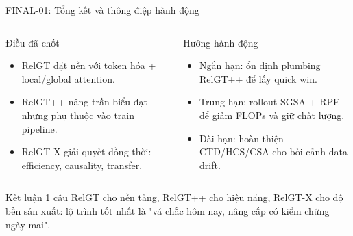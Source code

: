 \documentclass[aspectratio=169,11pt]{beamer}
\begin{document}
\begin{frame}{FINAL-01: Tổng kết và thông điệp hành động}
  \small
  \begin{columns}[T]
    \begin{block}{Điều đã chốt}
      \begin{itemize}
        \item RelGT đặt nền với token hóa + local/global attention.
        \item RelGT++ nâng trần biểu đạt nhưng phụ thuộc vào train pipeline.
        \item RelGT-X giải quyết đồng thời: efficiency, causality, transfer.
      \end{itemize}
    \end{block}
    \begin{exampleblock}{Hướng hành động}
      \begin{itemize}
        \item Ngắn hạn: ổn định plumbing RelGT++ để lấy quick win.
        \item Trung hạn: rollout SGSA + RPE để giảm FLOPs và giữ chất lượng.
        \item Dài hạn: hoàn thiện CTD/HCS/CSA cho bối cảnh data drift.
      \end{itemize}
    \end{exampleblock}
  \end{columns}
  \begin{alertblock}{Kết luận 1 câu}
    RelGT cho nền tảng, RelGT++ cho hiệu năng, RelGT-X cho độ bền sản xuất:
    lộ trình tốt nhất là "vá chắc hôm nay, nâng cấp có kiểm chứng ngày mai".
  \end{alertblock}
\end{frame}
\end{document}
